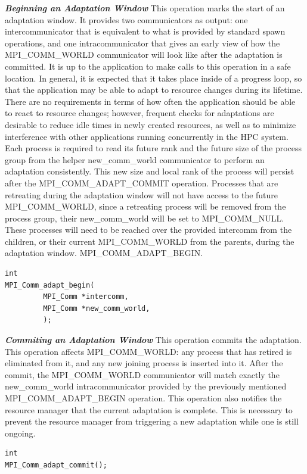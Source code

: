 \textbf{\textit{Beginning an Adaptation Window}} This operation marks the start of an adaptation window. It provides two communicators as output: one intercommunicator that is equivalent to what is provided by standard spawn operations, and one intracommunicator that gives an early view of how the MPI{\_}COMM{\_}WORLD communicator will look like after the adaptation is committed. It is up to the application to make calls to this operation in a safe location. In general, it is expected that it takes place inside of a progress loop, so that the application may be able to adapt to resource changes during its lifetime. There are no requirements in terms of how often the application should be able to react to resource changes; however, frequent checks for adaptations are desirable to reduce idle times in newly created resources, as well as to minimize interference with other applications running concurrently in the HPC system. Each process is required to read its future rank and the future  size of the process group from the helper new{\_}comm{\_}world communicator to perform an adaptation consistently. This new size and local rank of the process will persist after the MPI{\_}COMM{\_}ADAPT{\_}COMMIT operation. Processes that are retreating during the adaptation window will not have access to the future MPI{\_}COMM{\_}WORLD, since a retreating process will be removed from the process group, their new{\_}comm{\_}world will be set to MPI{\_}COMM{\_}NULL. These processes will need to be reached over the provided intercomm from the children, or their current MPI{\_}COMM{\_}WORLD from the parents, during the adaptation window. MPI{\_}COMM{\_}ADAPT{\_}BEGIN.
\begin{lstlisting}[frame=single]
int
MPI_Comm_adapt_begin( 
         MPI_Comm *intercomm,
         MPI_Comm *new_comm_world,
         );
\end{lstlisting}
\textbf{\textit{Commiting an Adaptation Window}} This operation commits the adaptation. This operation affects MPI{\_}COMM{\_}WORLD: any process that has retired is eliminated from it, and any new joining process is inserted into it. After the commit, the MPI{\_}COMM{\_}WORLD communicator will match exactly the new{\_}comm{\_}world intracommunicator provided by the previously mentioned MPI{\_}COMM{\_}ADAPT{\_}BEGIN operation. This operation also notifies the resource manager that the current adaptation is complete. This is necessary to prevent the resource manager from triggering a new adaptation while one is still ongoing.
\begin{lstlisting}[frame=single]
int
MPI_Comm_adapt_commit(); 
\end{lstlisting}
